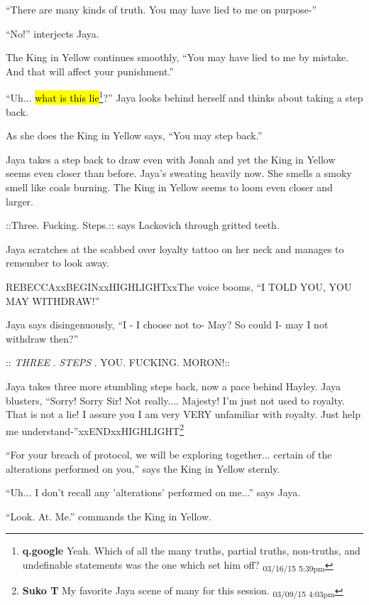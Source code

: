 ``There are many kinds of truth.  You may have lied to me on purpose-''

``No!'' interjects Jaya.

The King in Yellow continues smoothly, ``You may have lied to me by mistake.  And that will affect your punishment.''

``Uh... \hl{what is this lie}\footnote{\textbf{q.google }Yeah.  Which of all the many truths, partial truths, non-truths, and undefinable statements was the one which set him off? \textsubscript{03/16/15 5:39pm}}?'' Jaya looks behind herself and thinks about taking a step back.

As she does the King in Yellow says, ``You may step back.''

Jaya takes a step back to draw even with Jonah and yet the King in Yellow seems even closer than before.  Jaya's sweating heavily now.  She smells a smoky smell like coals burning.  The King in Yellow seems to loom even closer and larger.

 {\color[RGB]{74,134,232}::Three.  Fucking.  Steps.::}  says Lackovich through gritted teeth.

Jaya scratches at the scabbed over loyalty tattoo on her neck and manages to remember to look away.

REBECCAxxBEGINxxHIGHLIGHTxxThe voice booms, ``I TOLD YOU, YOU MAY WITHDRAW!''

Jaya says disingenuously, ``I - I choose not to- May?  So could I- may I not withdraw then?''

 {\color[RGB]{74,134,232}::} \textit{ {\color[RGB]{74,134,232}THREE} } {\color[RGB]{74,134,232}. } \textit{ {\color[RGB]{74,134,232} STEPS} } {\color[RGB]{74,134,232}.  YOU.  FUCKING.  MORON!::} 

Jaya takes three more stumbling steps back, now a pace behind Hayley.  Jaya blusters, ``Sorry!  Sorry Sir!  Not really.... Majesty!  I'm just not used to royalty.  That is not a lie!  I assure you I am very VERY unfamiliar with royalty.  Just help me understand-''xxENDxxHIGHLIGHT\footnote{\textbf{Suko T }My favorite Jaya scene of many for this session. \textsubscript{03/09/15 4:03pm}}

``For your breach of protocol, we will be exploring together... certain of the alterations performed on you,'' says the King in Yellow sternly.

``Uh... I don't recall any 'alterations' performed on me...'' says Jaya.

``Look.  At.  Me.'' commands the King in Yellow.

